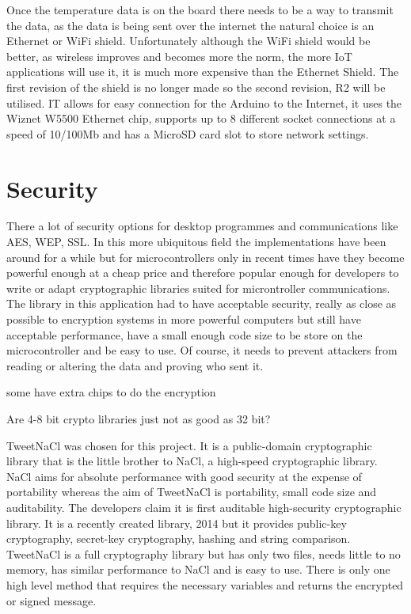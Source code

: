 Once the temperature data is on the board there needs to be a way to transmit the data, as the data is being sent over the internet the natural choice is an Ethernet or WiFi shield. Unfortunately although the WiFi shield would be better, as wireless improves and becomes more the norm, the more IoT applications will use it, it is much more expensive than the Ethernet Shield. The first revision of the shield is no longer made so the second revision, R2 will be utilised. IT allows for easy connection for the Arduino to the Internet, it uses the Wiznet W5500 Ethernet chip, supports up to 8 different socket connections at a speed of 10/100Mb and has a MicroSD card slot to store network settings. 

\section{Security}


There a lot of security options for desktop programmes and communications like AES, WEP, SSL. In this more ubiquitous field the implementations have been around for a while but for microcontrollers only in recent times have they become powerful enough at a cheap price and therefore popular enough for developers to write or adapt cryptographic libraries suited for microntroller communications. The library in this application had to have acceptable security, really as close as possible to encryption systems in more powerful computers but still have acceptable performance, have a small enough code size to be store on the microcontroller and be easy to use. Of course, it needs to prevent attackers from reading or altering the data and proving who sent it.

some have extra chips to do the encryption

Are 4-8 bit crypto libraries just not as good as 32 bit?

TweetNaCl was chosen for this project. It is a public-domain cryptographic library that is the little brother to NaCl, a high-speed cryptographic library. NaCl aims for absolute performance with good security at the expense of portability whereas the aim of TweetNaCl is portability, small code size and auditability. The developers claim it is first auditable high-security cryptographic library. It is a recently created library, 2014 but it provides public-key cryptography, secret-key cryptography, hashing and string comparison. TweetNaCl is a full cryptography library but has only two files, needs little to no memory, has similar performance to NaCl and is easy to use. There is only one high level method that requires the necessary variables and returns the encrypted or signed message.


